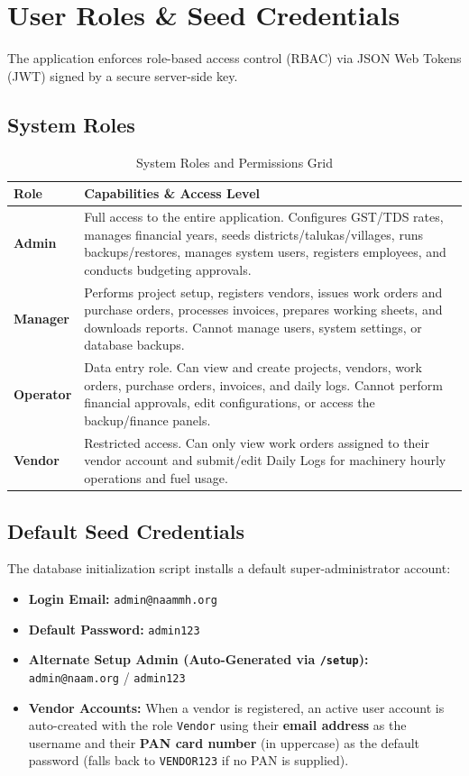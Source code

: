 \documentclass[11pt,a4paper]{article}
\begin{document}
\section{User Roles \& Seed Credentials}
The application enforces role-based access control (RBAC) via JSON Web Tokens (JWT) signed by a secure server-side key.

\subsection{System Roles}
\begin{table}[h]
\centering
\begin{tabular}{l p{11cm}}
\toprule
\textbf{Role} & \textbf{Capabilities \& Access Level} \\
\midrule
\textbf{Admin} & Full access to the entire application. Configures GST/TDS rates, manages financial years, seeds districts/talukas/villages, runs backups/restores, manages system users, registers employees, and conducts budgeting approvals. \\
\textbf{Manager} & Performs project setup, registers vendors, issues work orders and purchase orders, processes invoices, prepares working sheets, and downloads reports. Cannot manage users, system settings, or database backups. \\
\textbf{Operator} & Data entry role. Can view and create projects, vendors, work orders, purchase orders, invoices, and daily logs. Cannot perform financial approvals, edit configurations, or access the backup/finance panels. \\
\textbf{Vendor} & Restricted access. Can only view work orders assigned to their vendor account and submit/edit Daily Logs for machinery hourly operations and fuel usage. \\
\bottomrule
\end{tabular}
\caption{System Roles and Permissions Grid}
\end{table}

\subsection{Default Seed Credentials}
The database initialization script installs a default super-administrator account:
\begin{itemize}
    \item \textbf{Login Email:} \texttt{admin@naammh.org}
    \item \textbf{Default Password:} \texttt{admin123}
    \item \textbf{Alternate Setup Admin (Auto-Generated via \texttt{/setup}):} \texttt{admin@naam.org} / \texttt{admin123}
    \item \textbf{Vendor Accounts:} When a vendor is registered, an active user account is auto-created with the role \texttt{Vendor} using their \textbf{email address} as the username and their \textbf{PAN card number} (in uppercase) as the default password (falls back to \texttt{VENDOR123} if no PAN is supplied).
\end{itemize}
\end{document}

